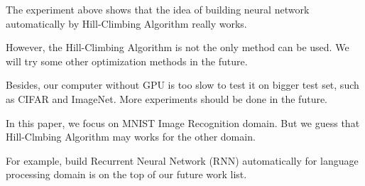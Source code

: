 \documentclass{article}
\begin{document}
The experiment above shows that the idea of building neural network automatically by Hill-Climbing Algorithm really works. 

However, the Hill-Climbing Algorithm is not the only method can be used. We will try some other optimization methods in the future.

Besides, our computer without GPU is too slow to test it on bigger test set, such as CIFAR and ImageNet. More experiments should be done in the future.

In this paper, we focus on MNIST Image Recognition domain. But we guess that Hill-Clmbing Algorithm may works for the other domain. 

For example, build Recurrent Neural Network (RNN) automatically for language processing domain is on the top of our future work list. 

  




\end{document}
